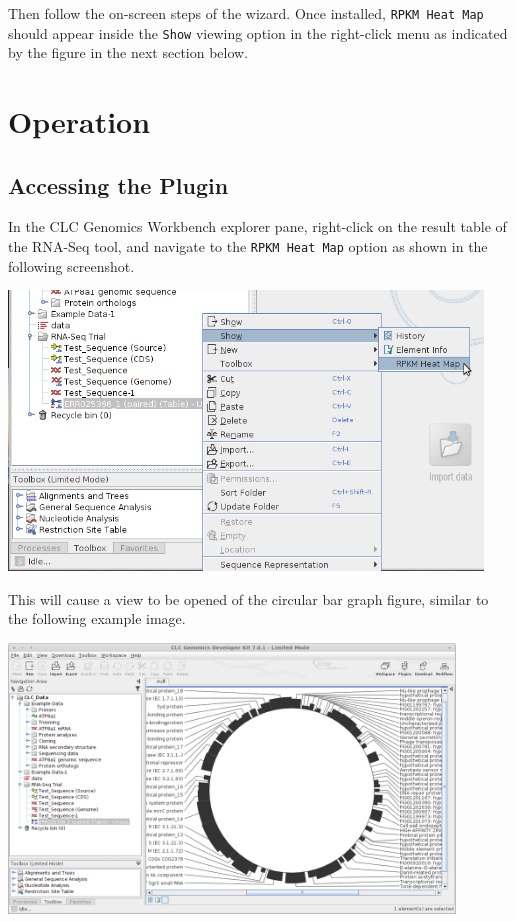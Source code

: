 \documentclass[12pt,letterpaper]{article}
\begin{document}
Then follow the on-screen steps of the wizard.  Once installed, \texttt{RPKM
Heat Map} should appear inside the \texttt{Show} viewing option in the
right-click menu as indicated by the figure in the next section below.

\section{Operation}

\subsection{Accessing the Plugin}

In the CLC Genomics Workbench explorer pane, right-click on the result table of
the RNA-Seq tool, and navigate to the \texttt{RPKM Heat Map} option as shown in
the following screenshot.

\begin{center}
    \includegraphics[width=34em]{access-plugin.png}
\end{center}

This will cause a view to be opened of the circular bar graph figure, similar
to the following example image.

\begin{center}
    \includegraphics[width=32em]{plugin-result.png}
\end{center}
\end{document}
